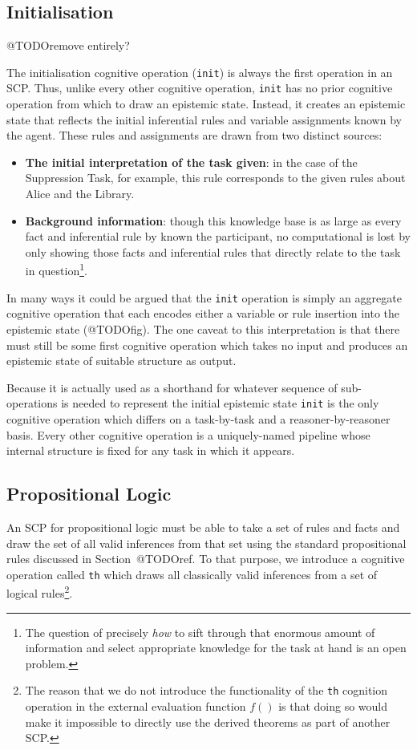 \subsection{Initialisation}
@TODOremove entirely?

The initialisation cognitive operation (\texttt{init}) is always the first operation in an SCP. Thus, unlike every other cognitive operation, \texttt{init} has no prior cognitive operation from which to draw an epistemic state. Instead, it creates an epistemic state that reflects the initial inferential rules and variable assignments known by the agent. These rules and assignments are drawn from two distinct sources:
\begin{itemize}
\item \textbf{The initial interpretation of the task given}: in the case of the Suppression Task, for example, this rule corresponds to the given rules about Alice and the Library.
\item \textbf{Background information}: though this knowledge base is as large as every fact and inferential rule by known the participant, no computational is lost by only showing those facts and inferential rules that directly relate to the task in question\footnote{The question of precisely \textit{how} to sift through that enormous amount of information and select appropriate knowledge for the task at hand is an open problem.}.
\end{itemize}

In many ways it could be argued that the \texttt{init} operation is simply an aggregate cognitive operation that each encodes either a variable or rule insertion into the epistemic state (@TODOfig). The one caveat to this interpretation is that there must still be some first cognitive operation which takes no input and produces an epistemic state of suitable structure as output.

Because it is actually used as a shorthand for whatever sequence of sub-operations is needed to represent the initial epistemic state \texttt{init} is the only cognitive operation which differs on a task-by-task and a reasoner-by-reasoner basis. Every other cognitive operation is a uniquely-named pipeline whose internal structure is fixed for any task in which it appears.

\subsection{Propositional Logic}
An SCP for propositional logic must be able to take a set of rules and facts and draw the set of all valid inferences from that set using the standard propositional rules discussed in Section~@TODOref. To that purpose, we introduce a cognitive operation called \texttt{th} which draws all classically valid inferences from a set of logical rules\footnote{The reason that we do not introduce the functionality of the \texttt{th} cognition operation in the external evaluation function $f()$ is that doing so would make it impossible to directly use the derived theorems as part of another SCP.}.

